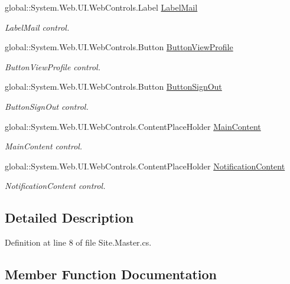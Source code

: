 \begin{DoxyCompactItemize}
global\+::\+System.\+Web.\+U\+I.\+Web\+Controls.\+Label \mbox{\hyperlink{classWebApplication_1_1SiteMaster_a594c1bf520b5ada76310e50df143e91b}{Label\+Mail}}
\begin{DoxyCompactList}\small\item\em Label\+Mail control. \end{DoxyCompactList}\item 
global\+::\+System.\+Web.\+U\+I.\+Web\+Controls.\+Button \mbox{\hyperlink{classWebApplication_1_1SiteMaster_a0977d0b502832c397e8672dead732892}{Button\+View\+Profile}}
\begin{DoxyCompactList}\small\item\em Button\+View\+Profile control. \end{DoxyCompactList}\item 
global\+::\+System.\+Web.\+U\+I.\+Web\+Controls.\+Button \mbox{\hyperlink{classWebApplication_1_1SiteMaster_aca81d110c413a44742be7fcd2c464cdc}{Button\+Sign\+Out}}
\begin{DoxyCompactList}\small\item\em Button\+Sign\+Out control. \end{DoxyCompactList}\item 
global\+::\+System.\+Web.\+U\+I.\+Web\+Controls.\+Content\+Place\+Holder \mbox{\hyperlink{classWebApplication_1_1SiteMaster_a8fdc1b5ff8c354ce9d5776cf0c5087a2}{Main\+Content}}
\begin{DoxyCompactList}\small\item\em Main\+Content control. \end{DoxyCompactList}\item 
global\+::\+System.\+Web.\+U\+I.\+Web\+Controls.\+Content\+Place\+Holder \mbox{\hyperlink{classWebApplication_1_1SiteMaster_ac0d3975658a8839098c53e1f37c8f1a5}{Notification\+Content}}
\begin{DoxyCompactList}\small\item\em Notification\+Content control. \end{DoxyCompactList}\end{DoxyCompactItemize}


\subsection{Detailed Description}


Definition at line 8 of file Site.\+Master.\+cs.



\subsection{Member Function Documentation}
\mbox{\label{classWebApplication_1_1SiteMaster_ab90867bea59adb9502f18812b0e2f531}} 
